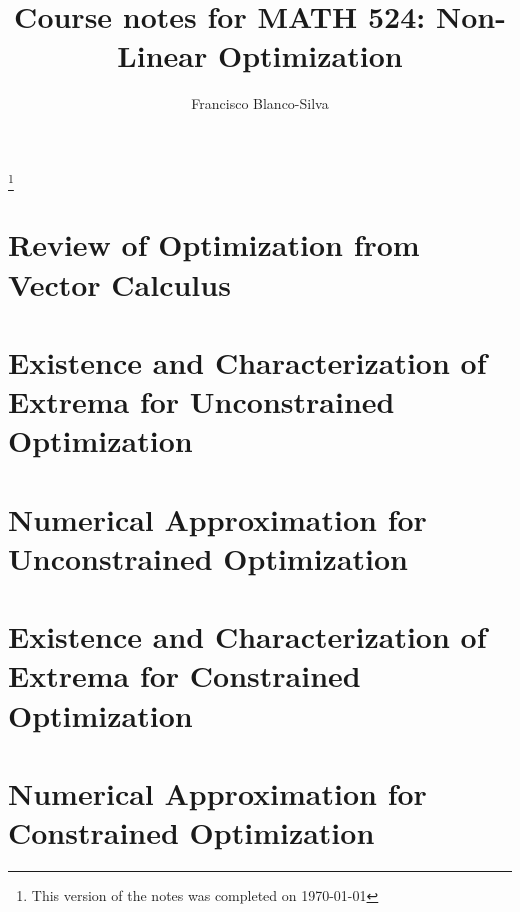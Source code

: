 \documentclass[11pt, reqno]{amsbook}
\begin{document}
\frontmatter
\title[Non-Linear Optimization]{Course notes for MATH 524: Non-Linear Optimization}
\author[F.J.~Blanco-Silva]{Francisco Blanco-Silva}
\address{Department of Mathematics\\ 
University of South Carolina}
\thanks{This version of the notes was completed on \today}
\maketitle
\tableofcontents
\listoffigures

\mainmatter

\chapter{Review of Optimization from Vector Calculus}
\label{chapter:intro}



\chapter[Unconstrained Optimization]{Existence and Characterization of Extrema for Unconstrained Optimization}
\label{chapter:UnconstrainedExistenceCharacterization}



\chapter{Numerical Approximation for Unconstrained Optimization}\label{chapter:UnconstrainedNumerical}







\chapter[Constrained Optimization]{Existence and Characterization of Extrema for Constrained Optimization}
\label{chapter:ConstrainedExistenceCharacterization}





\chapter{Numerical Approximation for Constrained Optimization}
\label{chapter:ConstrainedNumerical}





\printindex


\appendix



\end{document}
